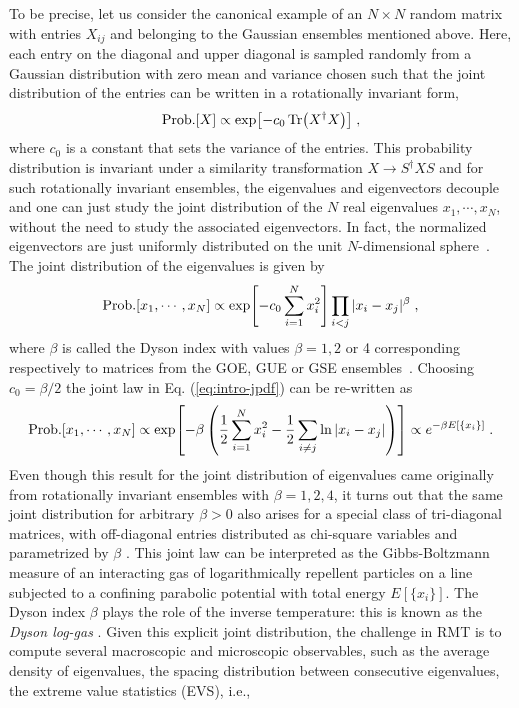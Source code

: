 \documentclass[onecolumn,superscriptaddress,
 amsmath,amssymb,
 aps,
 prd,
]{revtex4-1}
\newcommand{\bea}{\begin{eqnarray}}
\newcommand{\eea}{\end{eqnarray}}
\begin{document}
\vspace{0.1cm}
%
To be precise, let us consider the canonical example of an $N \times N$ random matrix with entries $X_{ij}$ and belonging to the Gaussian ensembles mentioned above. Here, each entry on the diagonal and upper diagonal is sampled randomly from a Gaussian distribution with zero mean and variance chosen such that the joint distribution of the entries can be written in a rotationally invariant form, 
\bea \label{Gauss}
{\rm Prob.}[X] \propto \exp[ - c_0 \Tr(X^\dagger X) ] \;,
\eea
where $c_0$ is a constant that sets the variance of the entries. This probability distribution is invariant under a similarity transformation $X \to S^\dagger X S$ and for such rotationally invariant ensembles, the eigenvalues and eigenvectors decouple and one can just study the joint distribution of the $N$ real eigenvalues $x_1, \cdots, x_N$, without the need to study the associated eigenvectors. In fact, the normalized eigenvectors are just uniformly distributed on the unit $N$-dimensional sphere~\cite{M91}. The joint distribution of the eigenvalues is given by \cite{M91,F10}
%
\begin{equation} \label{eq:intro-jpdf}
{\rm Prob.}[x_1, \cdots, x_N] \propto \exp[ - c_0 \sum_{i = 1}^N x_i^2 ] \prod_{i < j} |x_i - x_j |^\beta \;,
\end{equation}
where $\beta$ is called the Dyson index with values $\beta = 1, 2$ or 4 corresponding respectively to matrices from the GOE, GUE or GSE ensembles~\cite{M91,F10}. Choosing $c_0 = \beta/2$ the joint law in Eq. (\ref{eq:intro-jpdf}) can be re-written as
\begin{equation} \label{eq:intro-log-jpdf}
{\rm Prob.}[x_1, \cdots, x_N] \propto \exp[ - \beta \left( \frac{1}{2}\sum_{i = 1}^N x_i^2 -  \frac{1}{2}\sum_{i \neq j} \ln |x_i - x_j| \right) ] \propto e^{-\beta E[\{x_i\} ]} \;.
\end{equation}
Even though this result for the joint distribution of eigenvalues came originally from rotationally invariant ensembles with $\beta = 1,2, 4$, it turns out that the same joint distribution for arbitrary $\beta > 0$ also arises for a special class of tri-diagonal matrices, with off-diagonal entries distributed as chi-square variables and parametrized by $\beta$ \cite{DE02}. This joint law can be interpreted as the Gibbs-Boltzmann measure of an interacting gas of logarithmically repellent particles on a line subjected to a confining parabolic potential with total energy $E[\{x_i\} ]$. The Dyson index $\beta$ plays the role of the inverse temperature: this is known as the {\it Dyson log-gas} \cite{D62,D62b}. Given this explicit joint distribution, the challenge in RMT is to compute several macroscopic and microscopic observables, such as the average density of eigenvalues, the spacing distribution between consecutive eigenvalues, the extreme value statistics (EVS), i.e., 
\end{document}
